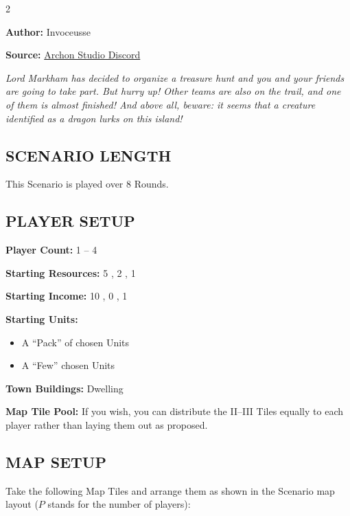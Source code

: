 
\begin{multicols}{2}

\textbf{Author:} Invoceusse

\textbf{Source:} \href{https://discord.com/channels/740870068178649108/1222679455261261986}{Archon Studio Discord}

\textit{Lord Markham has decided to organize a treasure hunt and you and your friends are going to take part.
  But hurry up! Other teams are also on the trail, and one of them is almost finished!
  And above all, beware: it seems that a creature identified as a dragon lurks on this island!}
\subsection*{\MakeUppercase{Scenario Length}}

This Scenario is played over 8 Rounds.

\subsection*{\MakeUppercase{Player Setup}}

\textbf{Player Count:} 1 -- 4

\textbf{Starting Resources:} 5 , 2 , 1 

\textbf{Starting Income:} 10 , 0 , 1 

\textbf{Starting Units:}
\begin{itemize}
  \item A ``Pack'' of chosen  Units
  \item A ``Few'' chosen  Units
\end{itemize}

\textbf{Town Buildings:}  Dwelling

\textbf{Map Tile Pool:} If you wish, you can distribute the II--III Tiles equally to each player rather than laying them out as proposed.

\subsection*{\MakeUppercase{Map Setup}}

Take the following Map Tiles and arrange them as shown in the Scenario map layout ($P$ stands for the number of players):


\end{multicols}
